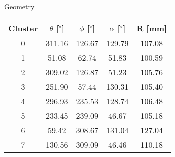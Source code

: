 \caption{Geometry}
\label{tab:Geo}
\begin{tabular}{ccccc}
\hline
Cluster  &  $\theta$ [$^\circ$]  &  $\phi$ [$^\circ$]  &  $\alpha$ [$^\circ$]  &  R [mm]  \\
\hline
0        &  311.16               &  126.67             &  129.79               &  107.08  \\
1        &  51.08                &  62.74              &  51.83                &  100.59  \\
2        &  309.02               &  126.87             &  51.23                &  105.76  \\
3        &  251.90               &  57.44              &  130.31               &  105.40  \\
4        &  296.93               &  235.53             &  128.74               &  106.48  \\
5        &  233.45               &  239.09             &  46.67                &  105.18  \\
6        &  59.42                &  308.67             &  131.04               &  127.04  \\
7        &  130.56               &  309.09             &  46.46                &  110.18  \\
\hline
\end{tabular}
